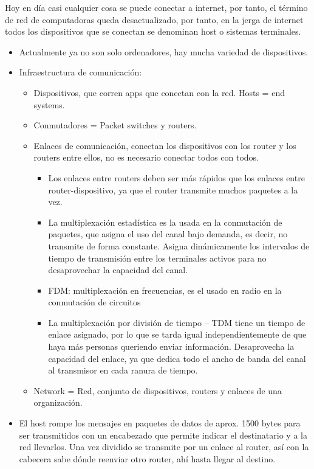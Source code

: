\documentclass[12pt, twoside, openright]{report} %
\begin{document}
Hoy en día casi cualquier cosa se puede conectar a internet, por
tanto, el término de red de computadoras queda desactualizado, por
tanto, en la jerga de internet todos los dispositivos que se conectan
se denominan host o sistemas terminales.

\begin{itemize}
	\item Actualmente ya no son solo ordenadores, hay mucha variedad de
	      dispositivos.
	\item Infraestructura de comunicación:

	      \begin{itemize}
		      \item Dispositivos, que corren apps que conectan con la red. Hosts = end
		            systems.
		      \item Conmutadores = Packet switches y routers.
		      \item Enlaces de comunicación, conectan los dispositivos con los router
		            y los routers entre ellos, no es necesario conectar todos con
		            todos.

		            \begin{itemize}
			            \item Los enlaces entre routers deben ser más rápidos que los enlaces
			                  entre router-dispositivo, ya que el router transmite muchos
			                  paquetes a la vez.
			            \item La multiplexación estadística es la usada en la conmutación de
			                  paquetes, que asigna el uso del canal bajo demanda, es decir, no
			                  transmite de forma constante. Asigna dinámicamente los
			                  intervalos de tiempo de transmisión entre los terminales activos
			                  para no desaprovechar la capacidad del canal.
			            \item FDM: multiplexación en frecuencias, es el usado en radio en la
			                  conmutación de circuitos
			            \item La multiplexación por división de tiempo -- TDM tiene un tiempo
			                  de enlace asignado, por lo que se tarda igual independientemente
			                  de que haya más personas queriendo enviar información.
			                  Desaprovecha la capacidad del enlace, ya que dedica todo el
			                  ancho de banda del canal al transmisor en cada ranura de tiempo.
		            \end{itemize}
		      \item Network = Red, conjunto de dispositivos, routers y enlaces de una
		            organización.
	      \end{itemize}
	      \pagebreak
	\item El host rompe los mensajes en paquetes de datos de aprox. 1500 bytes
	      para ser transmitidos con un encabezado que permite indicar el
	      destinatario y a la red llevarlos. Una vez dividido se transmite por
	      un enlace al router, así con la cabecera sabe dónde reenviar otro
	      router, ahí hasta llegar al destino.


\end{itemize}
\end{document}
